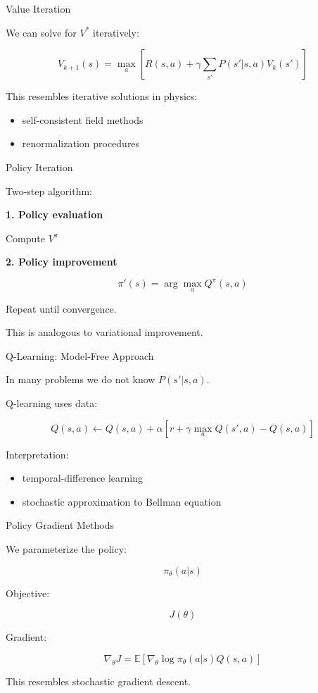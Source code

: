 \documentclass{beamer}
\begin{document}
\begin{frame}{Value Iteration}

We can solve for $V^*$ iteratively:

\[
V_{k+1}(s) = \max_a \left[
R(s,a) + \gamma \sum_{s'} P(s'|s,a)V_k(s')
\right]
\]

This resembles iterative solutions in physics:

\begin{itemize}
\item self-consistent field methods
\item renormalization procedures
\end{itemize}

\end{frame}

\begin{frame}{Policy Iteration}

Two-step algorithm:

\textbf{1. Policy evaluation}

Compute $V^\pi$

\textbf{2. Policy improvement}

\[
\pi'(s) = \arg\max_a Q^\pi(s,a)
\]

Repeat until convergence.

This is analogous to variational improvement.

\end{frame}

\begin{frame}{Q-Learning: Model-Free Approach}

In many problems we do not know $P(s'|s,a)$.

Q-learning uses data:

\[
Q(s,a) \leftarrow Q(s,a) + \alpha
\left[r + \gamma \max_a Q(s',a) - Q(s,a)\right]
\]

Interpretation:

\begin{itemize}
\item temporal-difference learning
\item stochastic approximation to Bellman equation
\end{itemize}

\end{frame}

\begin{frame}{Policy Gradient Methods}

We parameterize the policy:

\[
\pi_\theta(a|s)
\]

Objective:

\[
J(\theta)
\]

Gradient:

\[
\nabla_\theta J =
\mathbb{E}[\nabla_\theta \log \pi_\theta(a|s) Q(s,a)]
\]

This resembles stochastic gradient descent.

\end{frame}
\end{document}
